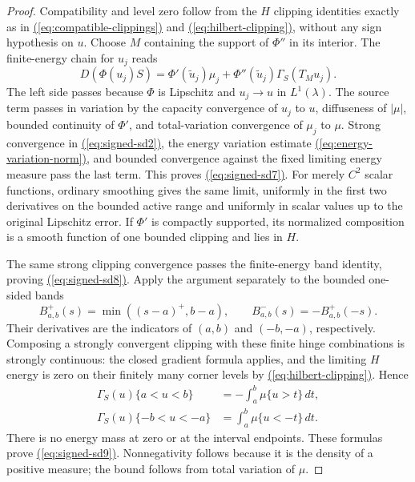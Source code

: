 \documentclass[11pt,reqno]{amsart}
\theoremstyle{definition}
\theoremstyle{remark}
\numberwithin{equation}{section}
\newcommand{\MathEqref}[1]{\begingroup\hypersetup{linkcolor=EquationLink}\hyperref[#1]{(\ref*{#1})}\endgroup}
\begin{document}
\begin{proof}
Compatibility and level zero follow from the $H$ clipping
identities exactly as in \MathEqref{eq:compatible-clippings} and \MathEqref{eq:hilbert-clipping}, without any sign
hypothesis on $u$.  Choose $M$ containing the support of
$\Phi''$ in its interior.  The finite-energy chain for $u_j$
reads
\[
 D(\Phi(u_j)S)=\Phi'(\widetilde u_j)\mu_j
                         +\Phi''(\widetilde u_j)\Gamma_S(T_Mu_j).
\]
The left side passes because $\Phi$ is Lipschitz and
$u_j\to u$ in $L^1(\lambda)$.  The source term passes in
variation by the capacity convergence of $u_j$
to $u$, diffuseness of $|\mu|$, bounded continuity of $\Phi'$, and
total-variation convergence of $\mu_j$ to $\mu$.
Strong convergence in \MathEqref{eq:signed-sd2}, the energy variation estimate
\MathEqref{eq:energy-variation-norm}, and bounded convergence against the fixed limiting
energy measure pass the last term.  This proves \MathEqref{eq:signed-sd7}.
For merely $C^2$ scalar functions, ordinary smoothing gives
the same limit, uniformly in the first two derivatives on
the bounded active range and uniformly in scalar values
up to the original Lipschitz error.
If $\Phi'$ is compactly supported, its normalized composition
is a smooth function of one bounded clipping and lies in $H$.

The same strong clipping convergence passes the finite-energy
band identity, proving \MathEqref{eq:signed-sd8}.  Apply the argument separately
to the bounded one-sided bands
\[
 B^+_{a,b}(s)=\min((s-a)^+,b-a),\qquad
 B^-_{a,b}(s)=-B^+_{a,b}(-s).
\]
Their derivatives are the indicators of $(a,b)$ and
$(-b,-a)$, respectively.  Composing a strongly convergent
clipping with these finite hinge combinations is strongly
continuous: the closed gradient formula applies, and the
limiting $H$ energy is zero on their finitely many corner
levels by \MathEqref{eq:hilbert-clipping}.  Hence
\[
 \begin{split}
 \Gamma_S(u)\{a<u<b\}&=-\int_a^b\mu\{u>t\}\,dt,\\
 \Gamma_S(u)\{-b<u<-a\}&=\int_a^b\mu\{u<-t\}\,dt.
 \end{split}
\]
There is no energy mass at zero or at the interval endpoints.
These formulas prove \MathEqref{eq:signed-sd9}.  Nonnegativity follows because
it is the density of a positive measure; the bound follows
from total variation of $\mu$.
\end{proof}
\end{document}
